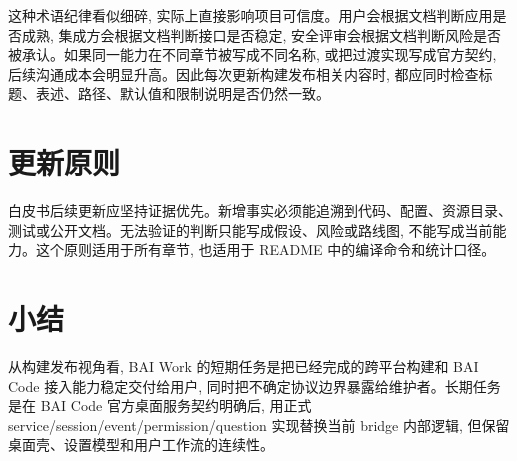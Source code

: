 这种术语纪律看似细碎, 实际上直接影响项目可信度。用户会根据文档判断应用是否成熟, 集成方会根据文档判断接口是否稳定, 安全评审会根据文档判断风险是否被承认。如果同一能力在不同章节被写成不同名称, 或把过渡实现写成官方契约, 后续沟通成本会明显升高。因此每次更新构建发布相关内容时, 都应同时检查标题、表述、路径、默认值和限制说明是否仍然一致。

\section{更新原则}
白皮书后续更新应坚持证据优先。新增事实必须能追溯到代码、配置、资源目录、测试或公开文档。无法验证的判断只能写成假设、风险或路线图, 不能写成当前能力。这个原则适用于所有章节, 也适用于 README 中的编译命令和统计口径。

\section{小结}
从构建发布视角看, BAI Work 的短期任务是把已经完成的跨平台构建和 BAI Code 接入能力稳定交付给用户, 同时把不确定协议边界暴露给维护者。长期任务是在 BAI Code 官方桌面服务契约明确后, 用正式 service/session/event/permission/question 实现替换当前 bridge 内部逻辑, 但保留桌面壳、设置模型和用户工作流的连续性。
